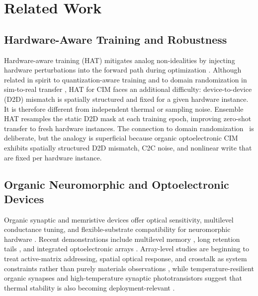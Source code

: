 \section{Related Work}
\label{sec:related-work}

\subsection{Hardware-Aware Training and Robustness}

Hardware-aware training (HAT) mitigates analog non-idealities by injecting hardware perturbations into the forward path during optimization \citep{joshi2020accurate}. Although related in spirit to quantization-aware training \citep{choi2019pact} and to domain randomization in sim-to-real transfer \citep{tobin2017domain}, HAT for CIM faces an additional difficulty: device-to-device (D2D) mismatch is spatially structured and fixed for a given hardware instance. It is therefore different from independent thermal or sampling noise. Ensemble HAT resamples the static D2D mask at each training epoch, improving zero-shot transfer to fresh hardware instances. The connection to domain randomization~\citep{tobin2017domain} is deliberate, but the analogy is superficial because organic optoelectronic CIM exhibits spatially structured D2D mismatch, C2C noise, and nonlinear write that are fixed per hardware instance.

\subsection{Organic Neuromorphic and Optoelectronic Devices}
\label{subsec:organic-devices}

Organic synaptic and memristive devices offer optical sensitivity, multilevel conductance tuning, and flexible-substrate compatibility for neuromorphic hardware \citep{xu2025emerging,photonics2025organicreview,beller2024organicneurons,ji2025singleoectneuron}. Recent demonstrations include multilevel memory \citep{guo2024organic,jung2024organicfilaments}, long retention tails \citep{zeng2023organicmemristor}, and integrated optoelectronic arrays \citep{gebregiorgis2023organiccim,zhang2025opect,zhang2025mooptoelectronic,cui2025multimode}. Array-level studies are beginning to treat active-matrix addressing, spatial optical response, and crosstalk as system constraints rather than purely materials observations \citep{visionarch2023crosstalk,amspa2024insensor,jang2023insensor}, while temperature-resilient organic synapses and high-temperature synaptic phototransistors suggest that thermal stability is also becoming deployment-relevant \citep{fuller2020tempresilient,guo2024hightemp}.

